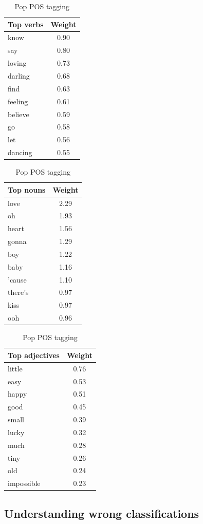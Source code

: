 \documentclass[a4paper,11pt]{article}
\begin{document}
\begin{table}[h!]
\centering
\begin{tabular}{|l|c|}
\hline
Top verbs & Weight \\
\hline
know & 0.90 \\
say & 0.80 \\
loving & 0.73 \\
darling & 0.68 \\
find & 0.63 \\
feeling & 0.61 \\
believe & 0.59 \\
go & 0.58 \\
let & 0.56 \\
dancing & 0.55 \\
\hline
\end{tabular}
\quad
\begin{tabular}{|l|c|}
\hline
Top nouns & Weight \\
\hline
love & 2.29 \\
oh & 1.93 \\
heart & 1.56 \\
gonna & 1.29 \\
boy & 1.22 \\
baby & 1.16 \\
'cause & 1.10 \\
there's & 0.97 \\
kiss & 0.97 \\
ooh & 0.96 \\
\hline
\end{tabular}
\quad
\begin{tabular}{|l|c|}
\hline
Top adjectives & Weight \\
\hline
little & 0.76 \\
easy & 0.53 \\
happy & 0.51 \\
good & 0.45 \\
small & 0.39 \\
lucky & 0.32 \\
much & 0.28 \\
tiny & 0.26 \\
old & 0.24 \\
impossible & 0.23 \\
\hline
\end{tabular}
\caption{Pop POS tagging}
\label{label-pop-pos}
\end{table}

\subsection{Understanding wrong classifications}
\end{document}
